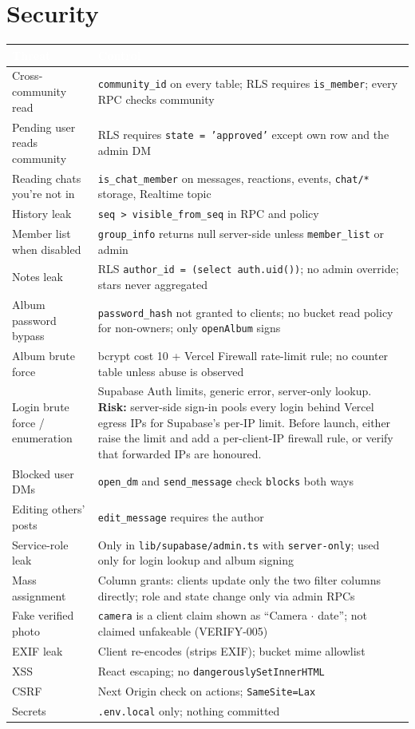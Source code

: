\documentclass[11pt,a4paper]{article}
\newcommand{\hdr}[1]{\textcolor{white}{\textbf{#1}}}
\newcommand{\code}[1]{\texttt{\small #1}}
\begin{document}
\section{Security}
{\small
{}
\begin{longtable}{L{4cm} L{11cm}}
\hdr{Threat} & \hdr{Control}\\
\endhead
Cross-community read & \code{community\_id} on every table; RLS requires \code{is\_member}; every RPC checks community\\
Pending user reads community & RLS requires \code{state = 'approved'} except own row and the admin DM\\
Reading chats you're not in & \code{is\_chat\_member} on messages, reactions, events, \code{chat/*} storage, Realtime topic\\
History leak & \code{seq > visible\_from\_seq} in RPC and policy\\
Member list when disabled & \code{group\_info} returns null server-side unless \code{member\_list} or admin\\
Notes leak & RLS \code{author\_id = (select auth.uid())}; no admin override; stars never aggregated\\
Album password bypass & \code{password\_hash} not granted to clients; no bucket read policy for non-owners; only \code{openAlbum} signs\\
Album brute force & bcrypt cost 10 + Vercel Firewall rate-limit rule; no counter table unless abuse is observed\\
Login brute force / enumeration & Supabase Auth limits, generic error, server-only lookup. \textbf{Risk:} server-side sign-in pools every login behind Vercel egress IPs for Supabase's per-IP limit. Before launch, either raise the limit and add a per-client-IP firewall rule, or verify that forwarded IPs are honoured.\\
Blocked user DMs & \code{open\_dm} and \code{send\_message} check \code{blocks} both ways\\
Editing others' posts & \code{edit\_message} requires the author\\
Service-role leak & Only in \code{lib/supabase/admin.ts} with \code{server-only}; used only for login lookup and album signing\\
Mass assignment & Column grants: clients update only the two filter columns directly; role and state change only via admin RPCs\\
Fake verified photo & \code{camera} is a client claim shown as ``Camera $\cdot$ date''; not claimed unfakeable (VERIFY-005)\\
EXIF leak & Client re-encodes (strips EXIF); bucket mime allowlist\\
XSS & React escaping; no \code{dangerouslySetInnerHTML}\\
CSRF & Next Origin check on actions; \code{SameSite=Lax}\\
Secrets & \code{.env.local} only; nothing committed\\
\end{longtable}
}
\end{document}
